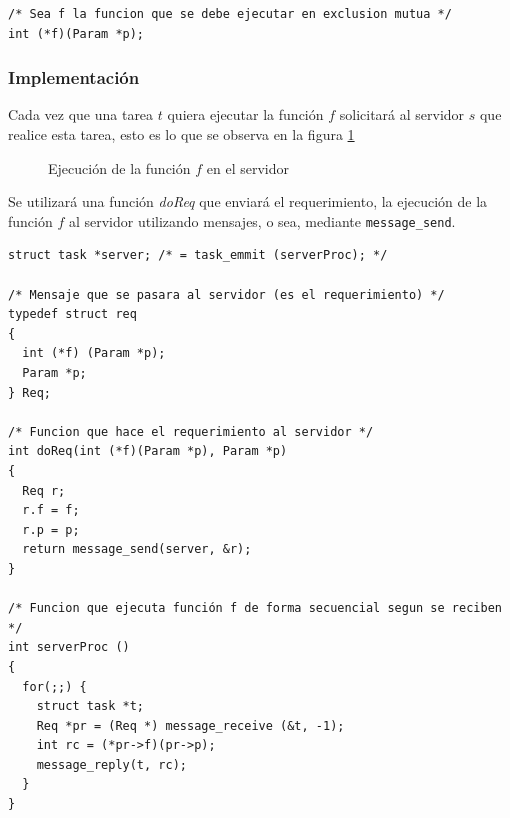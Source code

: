\begin{lstlisting}
/* Sea f la funcion que se debe ejecutar en exclusion mutua */
int (*f)(Param *p);
\end{lstlisting}

\subsubsection{Implementación}

Cada vez que una tarea $t$ quiera ejecutar la función $f$ solicitará al servidor
$s$ que realice esta tarea, esto es lo que se observa en la figura
\ref{fig:mensajes_servicio}

\begin{figure}[htbp]
	\centering
	\caption{Ejecución de la función $f$ en el servidor}
	\label{fig:mensajes_servicio}
\end{figure}

Se utilizará una función \emph{doReq} que enviará el requerimiento, la
ejecución de la función $f$ al servidor utilizando mensajes, o sea, mediante
\texttt{message\_send}.

\begin{lstlisting}
struct task *server; /* = task_emmit (serverProc); */

/* Mensaje que se pasara al servidor (es el requerimiento) */
typedef struct req
{
  int (*f) (Param *p);
  Param *p;
} Req;

/* Funcion que hace el requerimiento al servidor */
int doReq(int (*f)(Param *p), Param *p)
{
  Req r;
  r.f = f;
  r.p = p;
  return message_send(server, &r);
}

/* Funcion que ejecuta función f de forma secuencial segun se reciben */
int serverProc ()
{
  for(;;) {
    struct task *t;
    Req *pr = (Req *) message_receive (&t, -1);
    int rc = (*pr->f)(pr->p);
    message_reply(t, rc);
  }
}
\end{lstlisting}

